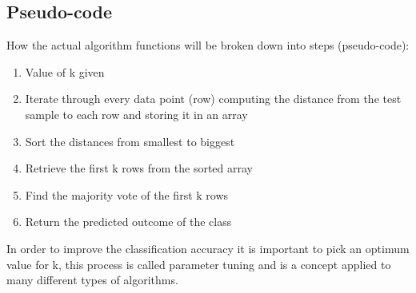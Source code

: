 \documentclass[12pt, a4paper]{article}
\begin{document}
\subsection*{Pseudo-code}

How the actual algorithm functions will be broken down into steps (pseudo-code):

\begin{enumerate}
	\item Value of k given
	\item Iterate through every data point (row) computing the distance from the test sample to each row and storing it in an array
	\item Sort the distances from smallest to biggest
	\item Retrieve the first k rows from the sorted array
	\item Find the majority vote of the first k rows
	\item Return the predicted outcome of the class
\end{enumerate} 
\hfill \break
In order to improve the classification accuracy it is important to pick an optimum value for k, this process is called parameter tuning and is a concept applied to many different types of algorithms.
\end{document}
